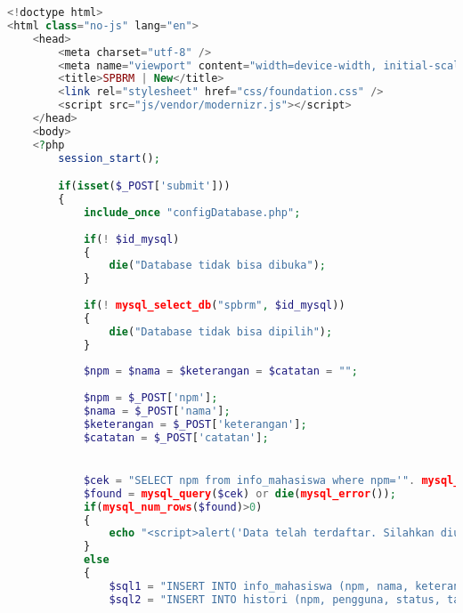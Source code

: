 \begin{lstlisting}[language=php,basicstyle=\tiny,caption=new.php]
<!doctype html>
<html class="no-js" lang="en">
	<head>
		<meta charset="utf-8" />
		<meta name="viewport" content="width=device-width, initial-scale=1.0" />
		<title>SPBRM | New</title>
		<link rel="stylesheet" href="css/foundation.css" />
		<script src="js/vendor/modernizr.js"></script>
	</head>
	<body>
	<?php
		session_start();

		if(isset($_POST['submit']))
		{
			include_once "configDatabase.php";
				
			if(! $id_mysql)
			{
				die("Database tidak bisa dibuka");
			}
				
			if(! mysql_select_db("spbrm", $id_mysql))
			{
				die("Database tidak bisa dipilih");
			}
			
			$npm = $nama = $keterangan = $catatan = "";
			
			$npm = $_POST['npm'];
			$nama = $_POST['nama'];
			$keterangan = $_POST['keterangan'];
			$catatan = $_POST['catatan']; 


			$cek = "SELECT npm from info_mahasiswa where npm='". mysql_real_escape_string($npm)  ."'";
			$found = mysql_query($cek) or die(mysql_error());
			if(mysql_num_rows($found)>0)
			{
				echo "<script>alert('Data telah terdaftar. Silahkan diulangi dengan data yang lain.');window.location.href='new.php';</script>";
			}
			else
			{
				$sql1 = "INSERT INTO info_mahasiswa (npm, nama, keterangan, catatan) VALUES ('$npm', '$nama', '$keterangan', '$catatan')";
				$sql2 = "INSERT INTO histori (npm, pengguna, status, tanggal_pembaruan, keterangan, catatan) VALUES ('". mysql_real_escape_string($npm)  ."', '".$_SESSION['email']."', 'membuat entri', now(), '". mysql_real_escape_string($keterangan)  ."', '". mysql_real_escape_string($catatan)  ."')";
				

\end{lstlisting}
